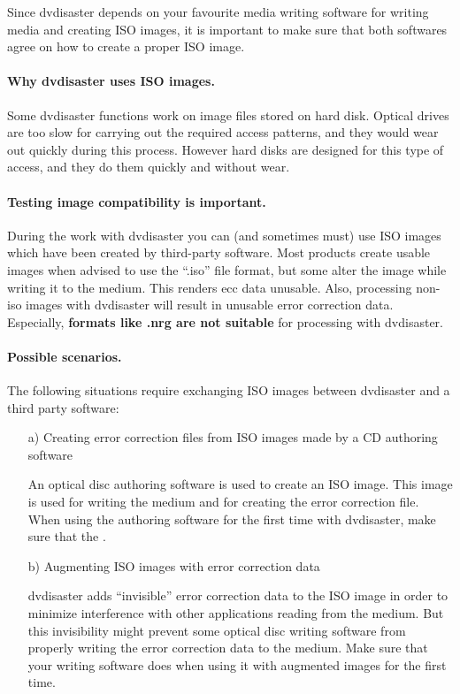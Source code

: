 Since dvdisaster depends on your favourite media writing software for writing media and creating
ISO images, it is important to make sure that both softwares
agree on how to create a proper ISO image.

\paragraph{Why dvdisaster uses ISO images.} Some dvdisaster functions work on 
image files stored on hard disk. Optical drives are too slow for carrying out 
the required access patterns, and they would wear out quickly during this process. 
However hard disks are designed for this type of access, and they do them quickly and without wear.

\paragraph{Testing image compatibility is important.} During the work with dvdisaster you 
can (and sometimes must) use ISO images which have been created by third-party software. 
Most products create usable images when advised to use the “.iso” file format, but some
alter the image while writing it to the medium. This renders ecc data unusable. Also,
processing non-iso images with dvdisaster will result in unusable error correction data. 
Especially, {\bf formats like .nrg are not suitable} for processing with dvdisaster.

\paragraph{Possible scenarios.} The following situations require 
exchanging ISO images between dvdisaster and a third party software:

\begin{itemize}
\item[a)] Creating error correction files from ISO images made by a CD authoring software

\smallskip

An optical disc authoring software is used to create an ISO image. This 
image is used for writing the medium and for creating the error correction file. 
When using the authoring software for the first time with dvdisaster, make sure 
that the .

\item[b)] Augmenting ISO images with error correction data

\smallskip

dvdisaster adds ``invisible'' error correction data to the ISO image
in  order to minimize interference with other applications reading from the medium.
But this invisibility might prevent some optical disc writing software from properly
writing the error correction data to the medium. Make sure that your 
writing software does 
when using it with augmented images for the first time.
\end{itemize}
 
